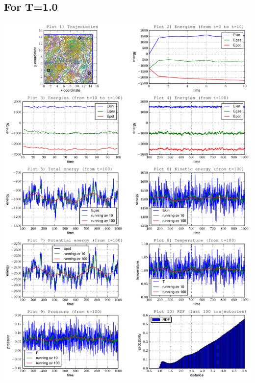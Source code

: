 \documentclass[12pt,a4paper]{scrartcl}
\begin{document}
\subsection*{For T=1.0}
\includegraphics[page=1, scale=0.6]{../plots/all10}
\end{document}
